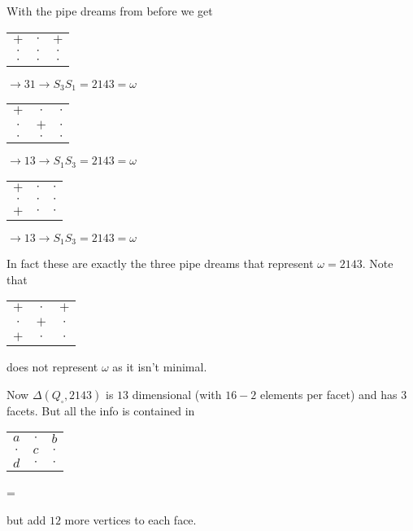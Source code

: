 \begin{example}
    With the pipe dreams from before we get

\begin{center}
    \begin{tabular}{ | c c c }
    \hline
    $+$ & $\cdot$ & $+$ \\
    $\cdot$ & $\cdot$ & $\cdot$ \\
    $\cdot$ & $\cdot$ & $\cdot$ 
    \end{tabular}
    $\rightarrow 31 \rightarrow S_3 S_1 = 2143 = \omega$
\end{center}
\begin{center}
    \begin{tabular}{ | c c c }
    \hline
    $+$ & $\cdot$ & $\cdot$ \\
    $\cdot$ & $+$ & $\cdot$ \\
    $\cdot$ & $\cdot$ & $\cdot$ 
    \end{tabular}
    $\rightarrow 13 \rightarrow S_1 S_3 = 2143 = \omega$
\end{center}
\begin{center}
    \begin{tabular}{ | c c c }
    \hline
    $+$ & $\cdot$ & $\cdot$ \\
    $\cdot$ & $\cdot$ & $\cdot$ \\
    $+$ & $\cdot$ & $\cdot$ 
    \end{tabular}
    $\rightarrow 13 \rightarrow S_1 S_3 = 2143 = \omega$
\end{center}

In fact these are exactly the three pipe dreams that represent $\omega = 2143$. Note that
\begin{center}
    \begin{tabular}{ | c c c }
    \hline
    $+$ & $\cdot$ & $+$ \\
    $\cdot$ & $+$ & $\cdot$ \\
    $+$ & $\cdot$ & $\cdot$ 
    \end{tabular}
\end{center}
does not represent $\omega$ as it isn't minimal.

Now $\Delta (Q_\square, 2143)$ is $13$ dimensional (with $16-2$ elements per facet) and has $3$ facets. But all the info is contained in
\begin{center}
    \begin{tabular}{ | c c c }
    \hline
    $a$ & $\cdot$ & $b$ \\
    $\cdot$ & $c$ & $\cdot$ \\
    $d$ & $\cdot$ & $\cdot$ 
    \end{tabular}
    =
\end{center}
but add $12$ more vertices to each face.
\end{example}

